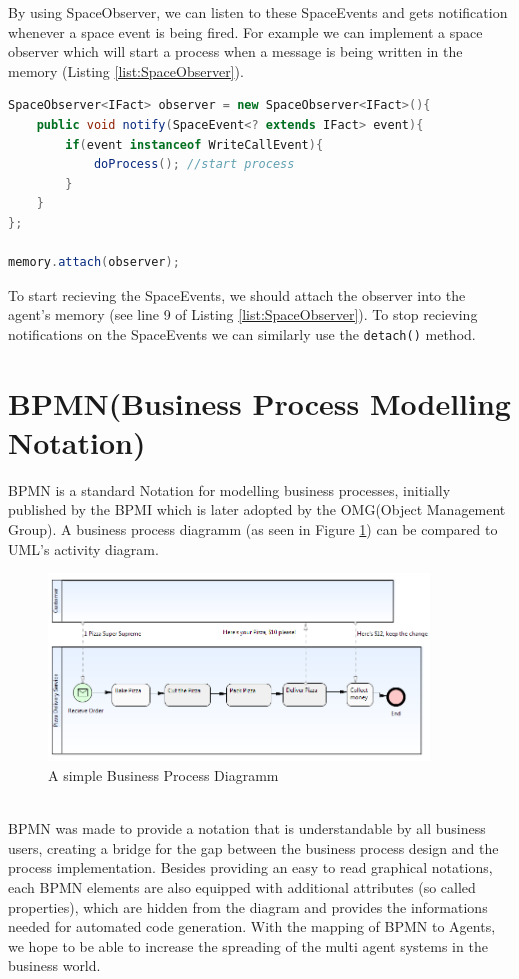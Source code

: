 By using SpaceObserver, we can listen to these SpaceEvents and gets notification whenever a space event is being fired.
For example we can implement a space observer which will start a process when a message is being written in the memory (Listing \ref{list:SpaceObserver}). 
\begin{lstlisting}[language = Java, caption = A SpaceObserver, label = list:SpaceObserver]
SpaceObserver<IFact> observer = new SpaceObserver<IFact>(){
	public void notify(SpaceEvent<? extends IFact> event){
		if(event instanceof WriteCallEvent){
			doProcess(); //start process
		}
	}
};

memory.attach(observer);
\end{lstlisting}

To start recieving the SpaceEvents, we should attach the observer into the agent's memory (see line 9 of Listing \ref{list:SpaceObserver}). To stop recieving notifications on the SpaceEvents we can similarly use the \texttt{detach()} method.

\section{BPMN(Business Process Modelling Notation)}
BPMN \cite{BPMN2} is a standard Notation for modelling business processes, initially published by the BPMI which is later adopted by the OMG(Object Management Group). A business process diagramm (as seen in Figure \ref{fig:bpmn_sampl}) can be compared to UML's activity diagram.
\begin{figure}[h]
	\centering
		\includegraphics[width=0.90\textwidth]{images/bpmn_sampl.png}
	\caption{A simple Business Process Diagramm}
	\label{fig:bpmn_sampl}
\end{figure}\\
BPMN was made to provide a notation that is understandable by all business users, creating a bridge for the gap between the business process design and the process implementation. Besides providing an easy to read graphical notations, each BPMN elements are also equipped with additional attributes (so called properties), which are hidden from the diagram and provides the informations needed for automated code generation. With the mapping of BPMN to Agents, we hope to be able to increase the spreading of the multi agent systems in the business world.

